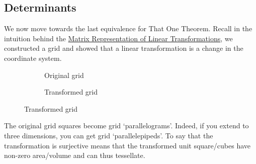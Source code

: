 \subsection{Determinants}
We now move towards the last equivalence for That One Theorem. Recall in the intuition behind the \hyperref[thm:matrixrep]{Matrix Representation of Linear Transformations}, we constructed a grid and showed that a linear transformation is a change in the coordinate system.\\
\begin{figure}[h]
	\begin{subfigure}[l]{0.4\textwidth}
			\caption{Original grid}
	\end{subfigure}
	\begin{subfigure}[r]{0.6\textwidth}
			\caption{Transformed grid}
	\end{subfigure}
\end{figure}
The original grid squares become grid `parallelograms'. Indeed, if you extend to three dimensions, you can get grid `parallelepipeds'.
To say that the transformation is surjective means that the transformed unit square/cubes have non-zero area/volume and can thus tessellate.



